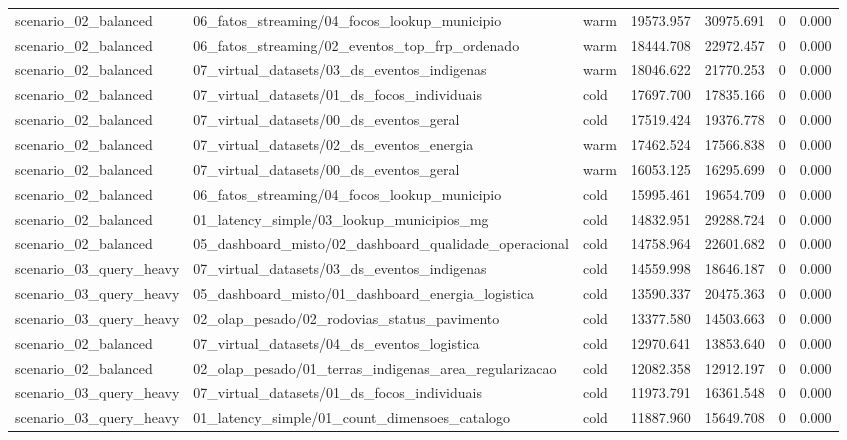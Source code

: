{\begin{longtable}{p{}p{}p{}p{}p{}p{}p{}}
scenario\_02\_balanced & 06\_fatos\_streaming/04\_focos\_lookup\_municipio & warm & 19573.957 & 30975.691 & 0 & 0.000 \\
scenario\_02\_balanced & 06\_fatos\_streaming/02\_eventos\_top\_frp\_ordenado & warm & 18444.708 & 22972.457 & 0 & 0.000 \\
scenario\_02\_balanced & 07\_virtual\_datasets/03\_ds\_eventos\_indigenas & warm & 18046.622 & 21770.253 & 0 & 0.000 \\
scenario\_02\_balanced & 07\_virtual\_datasets/01\_ds\_focos\_individuais & cold & 17697.700 & 17835.166 & 0 & 0.000 \\
scenario\_02\_balanced & 07\_virtual\_datasets/00\_ds\_eventos\_geral & cold & 17519.424 & 19376.778 & 0 & 0.000 \\
scenario\_02\_balanced & 07\_virtual\_datasets/02\_ds\_eventos\_energia & warm & 17462.524 & 17566.838 & 0 & 0.000 \\
scenario\_02\_balanced & 07\_virtual\_datasets/00\_ds\_eventos\_geral & warm & 16053.125 & 16295.699 & 0 & 0.000 \\
scenario\_02\_balanced & 06\_fatos\_streaming/04\_focos\_lookup\_municipio & cold & 15995.461 & 19654.709 & 0 & 0.000 \\
scenario\_02\_balanced & 01\_latency\_simple/03\_lookup\_municipios\_mg & cold & 14832.951 & 29288.724 & 0 & 0.000 \\
scenario\_02\_balanced & 05\_dashboard\_misto/02\_dashboard\_qualidade\_operacional & cold & 14758.964 & 22601.682 & 0 & 0.000 \\
scenario\_03\_query\_heavy & 07\_virtual\_datasets/03\_ds\_eventos\_indigenas & cold & 14559.998 & 18646.187 & 0 & 0.000 \\
scenario\_03\_query\_heavy & 05\_dashboard\_misto/01\_dashboard\_energia\_logistica & cold & 13590.337 & 20475.363 & 0 & 0.000 \\
scenario\_03\_query\_heavy & 02\_olap\_pesado/02\_rodovias\_status\_pavimento & cold & 13377.580 & 14503.663 & 0 & 0.000 \\
scenario\_02\_balanced & 07\_virtual\_datasets/04\_ds\_eventos\_logistica & cold & 12970.641 & 13853.640 & 0 & 0.000 \\
scenario\_02\_balanced & 02\_olap\_pesado/01\_terras\_indigenas\_area\_regularizacao & cold & 12082.358 & 12912.197 & 0 & 0.000 \\
scenario\_03\_query\_heavy & 07\_virtual\_datasets/01\_ds\_focos\_individuais & cold & 11973.791 & 16361.548 & 0 & 0.000 \\
scenario\_03\_query\_heavy & 01\_latency\_simple/01\_count\_dimensoes\_catalogo & cold & 11887.960 & 15649.708 & 0 & 0.000 \\
\bottomrule
\end{longtable}
}
